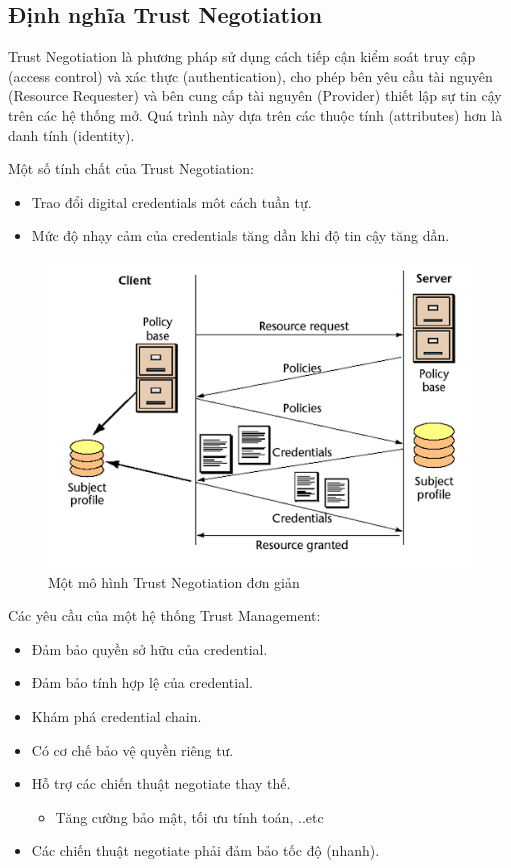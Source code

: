 \documentclass[12pt]{article}
\begin{document}
\subsection{Định nghĩa Trust Negotiation}
Trust Negotiation là phương pháp sử dụng cách tiếp cận kiểm soát truy cập (access control) và xác thực (authentication), cho phép bên yêu cầu tài nguyên (Resource Requester) và bên cung cấp tài nguyên (Provider) thiết lập sự tin cậy trên các hệ thống mở. Quá trình này dựa trên các thuộc tính (attributes) hơn là danh tính (identity).

Một số tính chất của Trust Negotiation:
\begin{itemize}
\item Trao đổi digital credentials môt cách tuần tự.
\item Mức độ nhạy cảm của credentials tăng dần khi độ tin cậy tăng dần.
\end{itemize}

\begin{figure}[H]
\centering
\includegraphics[scale=.5]{img/trust-simple.png}
\caption{Một mô hình Trust Negotiation đơn giản}
\label{fig:simple-trust}
\end{figure}

Các yêu cầu của một hệ thống Trust Management:
\begin{itemize}
\item Đảm bảo quyền sở hữu của credential.
\item Đảm bảo tính hợp lệ của credential.
\item Khám phá credential chain.
\item Có cơ chế bảo vệ quyền riêng tư.
\item Hỗ trợ các chiến thuật negotiate thay thế.
\begin{itemize}
\item Tăng cường bảo mật, tối ưu tính toán, ..etc
\end{itemize}
\item Các chiến thuật negotiate phải đảm bảo tốc độ (nhanh).
\end{itemize}
\end{document}
